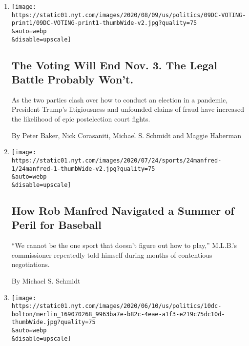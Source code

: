 \begin{enumerate}
\def\labelenumi{\arabic{enumi}.}
\item
  \href{/2020/08/08/us/politics/voting-nov-3-election.html}{}

  \texttt{[image: https://static01.nyt.com/images/2020/08/09/us/politics/09DC-VOTING-print1/09DC-VOTING-print1-thumbWide-v2.jpg?quality=75\\\&auto=webp\\\&disable=upscale]}

  \hypertarget{the-voting-will-end-nov-3-the-legal-battle-probably-wont}{%
  \subsection{The Voting Will End Nov. 3. The Legal Battle Probably
  Won't.}\label{the-voting-will-end-nov-3-the-legal-battle-probably-wont}}

  As the two parties clash over how to conduct an election in a
  pandemic, President Trump's litigiousness and unfounded claims of
  fraud have increased the likelihood of epic postelection court fights.

  By Peter Baker, Nick Corasaniti, Michael S. Schmidt and Maggie
  Haberman
\item
  \href{/2020/07/25/sports/rob-manfred-mlb-season.html}{}

  \texttt{[image: https://static01.nyt.com/images/2020/07/24/sports/24manfred-1/24manfred-1-thumbWide-v2.jpg?quality=75\\\&auto=webp\\\&disable=upscale]}

  \hypertarget{how-rob-manfred-navigated-a-summer-of-peril-for-baseball}{%
  \subsection{How Rob Manfred Navigated a Summer of Peril for
  Baseball}\label{how-rob-manfred-navigated-a-summer-of-peril-for-baseball}}

  ``We cannot be the one sport that doesn't figure out how to play,''
  M.L.B.'s commissioner repeatedly told himself during months of
  contentious negotiations.

  By Michael S. Schmidt
\item
  \href{/2020/06/10/us/politics/trump-john-bolton-book.html}{}

  \texttt{[image: https://static01.nyt.com/images/2020/06/10/us/politics/10dc-bolton/merlin\_169070268\_9963ba7e-b82c-4eae-a1f3-e219c75dc10d-thumbWide.jpg?quality=75\\\&auto=webp\\\&disable=upscale]}

  \hypertarget{white-house-tells-bolton-his-book-still-contains-classified-information}{%
}
\end{enumerate}

